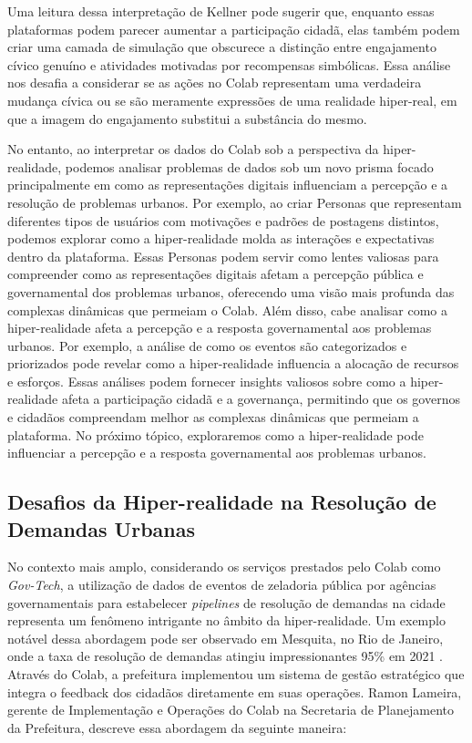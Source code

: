 Uma leitura dessa interpretação de Kellner pode sugerir que, enquanto essas plataformas podem parecer aumentar a participação cidadã, elas também podem criar uma camada de simulação que obscurece a distinção entre engajamento cívico genuíno e atividades motivadas por recompensas simbólicas. Essa análise nos desafia a considerar se as ações no Colab representam uma verdadeira mudança cívica ou se são meramente expressões de uma realidade hiper-real, em que a imagem do engajamento substitui a substância do mesmo.

No entanto, ao interpretar os dados do Colab sob a perspectiva da hiper-realidade, podemos analisar problemas de dados sob um novo prisma focado principalmente em como as representações digitais influenciam a percepção e a resolução de problemas urbanos. Por exemplo, ao criar Personas que representam diferentes tipos de usuários com motivações e padrões de postagens distintos, podemos explorar como a hiper-realidade molda as interações e expectativas dentro da plataforma. Essas Personas podem servir como lentes valiosas para compreender como as representações digitais afetam a percepção pública e governamental dos problemas urbanos, oferecendo uma visão mais profunda das complexas dinâmicas que permeiam o Colab. Além disso, cabe analisar como a hiper-realidade afeta a percepção e a resposta governamental aos problemas urbanos. Por exemplo, a análise de como os eventos são categorizados e priorizados pode revelar como a hiper-realidade influencia a alocação de recursos e esforços. Essas análises podem fornecer insights valiosos sobre como a hiper-realidade afeta a participação cidadã e a governança, permitindo que os governos e cidadãos compreendam melhor as complexas dinâmicas que permeiam a plataforma. No próximo tópico, exploraremos como a hiper-realidade pode influenciar a percepção e a resposta governamental aos problemas urbanos.

\subsection*{Desafios da Hiper-realidade na Resolução de Demandas Urbanas}

No contexto mais amplo, considerando os serviços prestados pelo Colab como \textit{Gov-Tech}, a utilização de dados de eventos de zeladoria pública por agências governamentais para estabelecer \textit{pipelines} de resolução de demandas na cidade representa um fenômeno intrigante no âmbito da hiper-realidade. Um exemplo notável dessa abordagem pode ser observado em Mesquita, no Rio de Janeiro, onde a taxa de resolução de demandas atingiu impressionantes 95\% em 2021 \cite{2021_Colab_PAGE}. Através do Colab, a prefeitura implementou um sistema de gestão estratégico que integra o feedback dos cidadãos diretamente em suas operações. Ramon Lameira, gerente de Implementação e Operações do Colab na Secretaria de Planejamento da Prefeitura, descreve essa abordagem da seguinte maneira:

